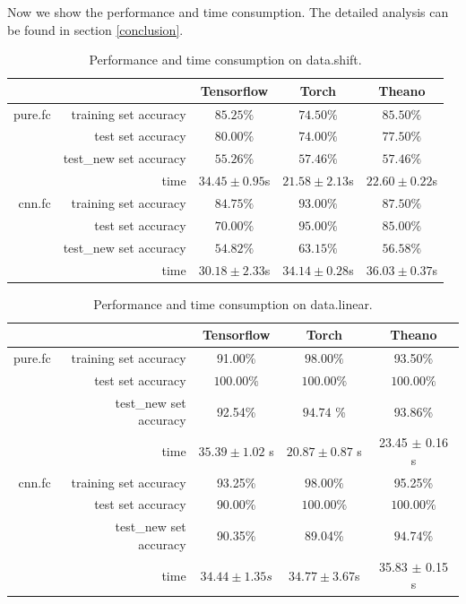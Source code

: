 \documentclass[a4paper]{article}
\begin{document}
Now we show the performance and time consumption. The detailed analysis can be found in section \ref{conclusion}.

\begin{table}[H]
\centering
\begin{tabular}{|r|r|c|c|c|}
\hline
 & & Tensorflow & Torch & Theano \\
\hline
pure.fc & training set accuracy & $85.25\%$ & $74.50\%$ & $\bm{85.50}\%$ \\
 & test set accuracy & $\bm{80.00}\%$ & $74.00\%$ & $77.50\%$ \\
 & test\_new set accuracy & $55.26\%$ & $\bm{57.46}\%$ & $\bm{57.46}\%$ \\
 & time & $34.45\pm0.95$s & $\bm{21.58\pm2.13}$s & $22.60\pm0.22$s \\
\hline
cnn.fc & training set accuracy & $84.75\%$ & $\bm{93.00}\%$ & $87.50\%$ \\
 & test set accuracy & $70.00\%$ & $\bm{95.00}\%$ & $85.00\%$ \\
 & test\_new set accuracy & $54.82\%$ & $\bm{63.15}\%$ & $56.58\%$ \\
 & time & $\bm{30.18\pm2.33}$s & $34.14\pm0.28$s & $36.03\pm0.37$s \\
\hline
\end{tabular}
\caption{Performance and time consumption on data.shift.}
\end{table}

\begin{table}[H]
\centering
\begin{tabular}{|r|r|c|c|c|}
\hline
 & & Tensorflow & Torch & Theano \\
\hline
pure.fc & training set accuracy & 91.00\% & $\bm{98.00\%}$ & 93.50\% \\
 & test set accuracy & $\bm{100.00\%}$ & $\bm{100.00\%}$ & $\bm{100.00\%}$ \\
 & test\_new set accuracy & 92.54\% & $\bm{94.74}$ \% & 93.86\%\\
 & time & $35.39 \pm 1.02$ s & $\bm{20.87 \pm 0.87}$ s & 23.45 $\pm$ 0.16 s \\
\hline
cnn.fc & training set accuracy & 93.25\% & $\bm{98.00\%}$ & 95.25\% \\
 & test set accuracy & 90.00\% & $\bm{100.00\%}$ & $\bm{100.00\%}$ \\
 & test\_new set accuracy & 90.35\% & 89.04\% & $\bm{94.74}\%$  \\
 & time & $\bm{34.44 \pm 1.35} s$ & $34.77 \pm 3.67$s & 35.83 $\pm$ 0.15 s\\
\hline
\end{tabular}
\caption{Performance and time consumption on data.linear.}
\end{table}
\end{document}
